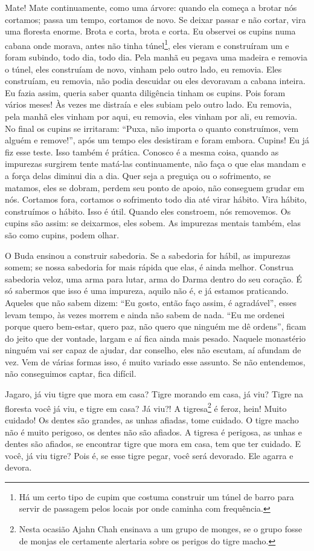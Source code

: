 Mate! Mate continuamente, como uma árvore: quando ela começa a
brotar nós cortamos; passa um tempo, cortamos de novo. Se deixar passar
e não cortar, vira uma floresta enorme. Brota e corta, brota e corta.
Eu observei os cupins numa cabana onde morava, antes não tinha
túnel\footnote{Há um certo tipo de cupim que costuma construir um túnel
de barro para servir de passagem pelos locais por onde caminha com
frequência.}, eles vieram e construíram um e foram subindo, todo dia,
todo dia. Pela manhã eu pegava uma madeira e removia o túnel, eles
construíam de novo, vinham pelo outro lado, eu removia. Eles
construíam, eu removia, não podia descuidar ou eles devoravam a cabana
inteira. Eu fazia assim, queria saber quanta diligência tinham os
cupins. Pois foram vários meses! Às vezes me distraía e eles subiam
pelo outro lado. Eu removia, pela manhã eles vinham por aqui, eu
removia, eles vinham por ali, eu removia. No final os cupins se
irritaram: “Puxa, não importa o quanto construímos, vem alguém e
remove!”, após um tempo eles desistiram e foram embora. Cupins! Eu já
fiz esse teste. Isso também é prática. Conosco é a mesma coisa, quando
as impurezas surgirem tente matá-las continuamente, não faça o que elas
mandam e a força delas diminui dia a dia. Quer seja a preguiça ou o
sofrimento, se matamos, eles se dobram, perdem seu ponto de apoio, não
conseguem grudar em nós. Cortamos fora, cortamos o sofrimento todo dia
até virar hábito. Vira hábito, construímos o hábito. Isso é útil.
Quando eles constroem, nós removemos. Os cupins são assim: se
deixarmos, eles sobem. As impurezas mentais também, elas são como
cupins, podem olhar.

O Buda ensinou a construir sabedoria. Se a sabedoria for hábil, as
impurezas somem; se nossa sabedoria for mais rápida que elas, é ainda
melhor. Construa sabedoria veloz, uma arma para lutar, arma do Darma
dentro do seu coração. É só sabermos que isso é uma impureza, aquilo
não é, e já estamos praticando. Aqueles que não sabem dizem: “Eu gosto,
então faço assim, é agradável”, esses levam tempo, às vezes morrem e
ainda não sabem de nada. “Eu me ordenei porque quero bem-estar, quero
paz, não quero que ninguém me dê ordens”, ficam do jeito que der
vontade, largam e aí fica ainda mais pesado. Naquele monastério ninguém
vai ser capaz de ajudar, dar conselho, eles não escutam, aí afundam de
vez. Vem de várias formas isso, é muito variado esse assunto. Se não
entendemos, não conseguimos captar, fica difícil. 

Jagaro, já viu tigre que mora em casa? Tigre morando em casa, já
viu? Tigre na floresta você já viu, e tigre em casa? Já viu?! A
tigresa\footnote{Nesta ocasião Ajahn Chah ensinava a um grupo de
monges, se o grupo fosse de monjas ele certamente alertaria sobre os
perigos do tigre macho.} é feroz, hein! Muito cuidado! Os dentes são
grandes, as unhas afiadas, tome cuidado. O tigre macho não é muito
perigoso, os dentes não são afiados. A tigresa é perigosa, as unhas e
dentes são afiados, se encontrar tigre que mora em casa, tem que ter
cuidado. E você, já viu tigre? Pois é, se esse tigre pegar, você será
devorado. Ele agarra e devora. 

